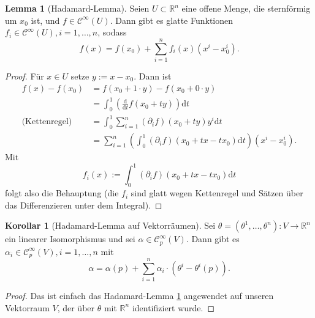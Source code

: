 \documentclass[a4paper]{scrreprt}
\numberwithin{equation}{chapter}
\newcommand{\D}{\mathrm{d}}
\newcommand{\sC}{\mathcal{C}^{\infty}}
\theoremstyle{definition}
\newtheorem{lemma}[defn]{Lemma}
\newtheorem{kor}[defn]{Korollar}
\begin{document}
\begin{lemma}[Hadamard-Lemma] \label{lemma:Hadamard}
	Seien $U \subset \mathbb R^n$ eine offene Menge, die sternförmig um $x_0$ ist, und $f \in \sC(U)$. Dann gibt es glatte Funktionen $f_i \in \sC(U), i = 1,\dots,n$, sodass \[f(x) = f(x_0) + \sum_{i=1}^n f_i(x) (x^i - x_0^i).\]
	
	\begin{proof}
		Für $x \in U$ setze $y := x - x_0$. Dann ist
		\begin{align*}
		f(x) - f(x_0) &= f(x_0 + 1\cdot y) - f(x_0 + 0\cdot y)\\
		&= \int_0^1 \left(\frac{\D}{\D t} f(x_0 + ty)\right) \D t\\
		\text{(Kettenregel)} \quad &= \int_0^1 \sum_{i=1}^n (\partial_i f)(x_0 + ty) y^i \D t\\
		&= \sum_{i=1}^n \left(\int_0^1 (\partial_i f)(x_0 + tx - tx_0) \D t\right) (x^i - x_0^i).
		\end{align*}
		Mit \[f_i(x) := \int_0^1 (\partial_i f)(x_0 + tx - tx_0) \D t\] folgt also die Behauptung (die $f_i$ sind glatt wegen Kettenregel und Sätzen über das Differenzieren unter dem Integral).
	\end{proof}
\end{lemma}

\begin{kor}[Hadamard-Lemma auf Vektorräumen]
	Sei $\theta = (\theta^1, \dots, \theta^n) \colon V \to \mathbb R^n$ ein linearer Isomorphismus und sei $\alpha \in \sC_p(V)$. Dann gibt es $\alpha_i \in \sC_p(V), i = 1,\dots, n$ mit \[\alpha = \alpha(p) + \sum_{i=1}^n \alpha_i \cdot (\theta^i - \theta^i(p)).\]
	
	\begin{proof}
		Das ist einfach das Hadamard-Lemma \ref{lemma:Hadamard} angewendet auf unseren Vektorraum $V$, der über $\theta$ mit $\mathbb R^n$ identifiziert wurde.
	\end{proof}
\end{kor}
\end{document}

